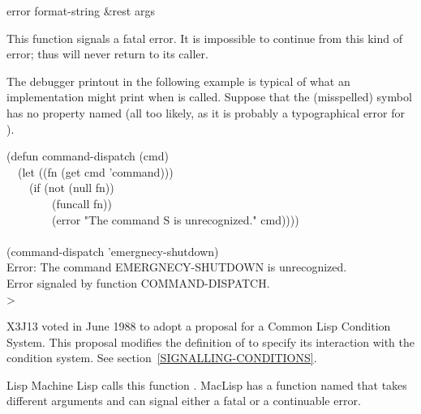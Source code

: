 \begin{defun}[Function]
error format-string &rest args

\begin{obsolete}\noindent
This function signals a fatal error.  It is impossible to continue
from this kind of 
error; thus  will never return to its caller.

The debugger printout in the following example is typical of what
an implementation might print when  is called.
Suppose that the (misspelled) symbol  has no property
named  (all too likely, as it is probably a typographical
error for ).
\begin{lisp}
(defun command-dispatch (cmd) \\
~~(let ((fn (get cmd 'command))) \\
~~~~(if (not (null fn)) \\
~~~~~~~~(funcall fn)) \\
~~~~~~~~(error "The command {\Xtilde}S is unrecognized." cmd)))) \\
 \\
(command-dispatch 'emergnecy-shutdown) \\
Error: The command EMERGNECY-SHUTDOWN is unrecognized. \\
Error signaled by function COMMAND-DISPATCH. \\
> 
\end{lisp}
\end{obsolete}

\begin{new}
X3J13 voted in June 1988
to adopt a proposal for a Common Lisp Condition System. 
This proposal modifies the definition of  to specify its interaction
with the condition system.  See section~\ref{SIGNALLING-CONDITIONS}.
\end{new}

\beforenoterule
\begin{incompatibility}
Lisp Machine Lisp calls this function .
MacLisp has a function named  that takes
different arguments and can signal either a fatal or a continuable error.
\end{incompatibility}
\afternoterule
\end{defun}

